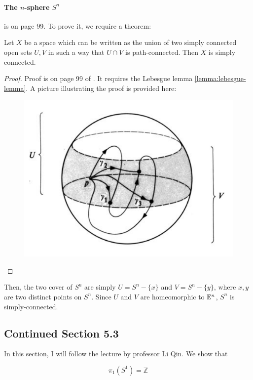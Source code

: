 \paragraph{The $n$-sphere $S^n$} is on page 99. To prove it, we
require a theorem:
\begin{thm}
    Let $X$ be a space which can be written as the union of two simply
    connected open sets $U,V$ in such a way that $U\cap V$ is
    path-connected. Then $X$ is simply connected.
\end{thm}
\begin{proof}
    Proof is on page 99 of \cite{book}. It requires the Lebesgue lemma
    \ref{lemma:lebesgue-lemma}. A picture illustrating the proof is
    provided here:
    \begin{figure}[H]
        \centering
        \includegraphics[width=0.6\linewidth]
        {pics/n-sphere-is-simply-con.PNG}
    \end{figure}
\end{proof}
Then, the two cover of $S^n$ are simply $U=S^n-\{x\}$ and
$V=S^n-\{y\}$, where $x,y$ are two distinct points on $S^n$. Since $U$
and $V$ are homeomorphic to $\mathbb{E}^n$, $S^n$ is simply-connected.

\subsection{Continued Section 5.3}
\label{sec:Continued-Section-5.3}
In this section, I will follow the lecture by professor Li Qin.
We show that
\begin{thm}
    $$\pi_1 (S^1) = \mathbb{Z} $$
\end{thm}

